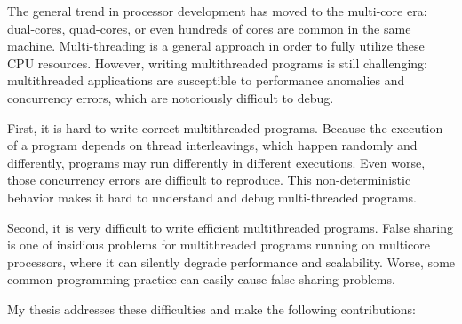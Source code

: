 The general trend in processor development has moved to the multi-core era: dual-cores, quad-cores, or even hundreds of cores are common in the same machine. Multi-threading is a general approach in order to fully utilize these CPU resources. However, writing multithreaded programs is still challenging: multithreaded applications are susceptible to performance anomalies and concurrency errors, which are notoriously difficult to debug.

First, it is hard to write correct multithreaded programs.  
Because the execution of a program depends on thread interleavings, which happen randomly and differently, programs may run differently in different executions. Even worse, those concurrency errors are difficult to reproduce. This non-deterministic behavior makes it hard to understand and debug multi-threaded programs.

Second, it is very difficult to write efficient multithreaded programs. False sharing is one of insidious problems for multithreaded programs running on multicore processors, where it can silently degrade performance and scalability. Worse, some common programming practice can easily cause false sharing problems.


My thesis addresses these difficulties and make the following contributions:

